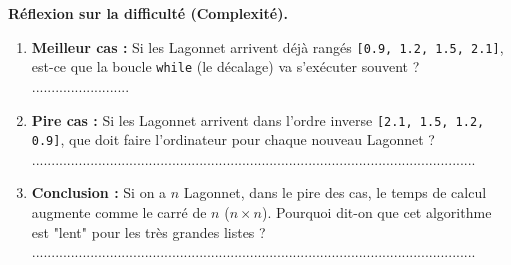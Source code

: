 \begin{Exercise}[title={Analyse et Simulation}]
\Question \textbf{Réflexion sur la difficulté (Complexité).}
\begin{enumerate}
    \item \textbf{Meilleur cas :} Si les Lagonnet arrivent déjà rangés \texttt{[0.9, 1.2, 1.5, 2.1]}, est-ce que la boucle \texttt{while} (le décalage) va s'exécuter souvent ? .........................
    \item \textbf{Pire cas :} Si les Lagonnet arrivent dans l'ordre inverse \texttt{[2.1, 1.5, 1.2, 0.9]}, que doit faire l'ordinateur pour chaque nouveau Lagonnet ? \\ ..................................................................................................................
    \item \textbf{Conclusion :} Si on a $n$ Lagonnet, dans le pire des cas, le temps de calcul augmente comme le carré de $n$ ($n \times n$). Pourquoi dit-on que cet algorithme est "lent" pour les très grandes listes ? \\ ..................................................................................................................
\end{enumerate}

\end{Exercise}
